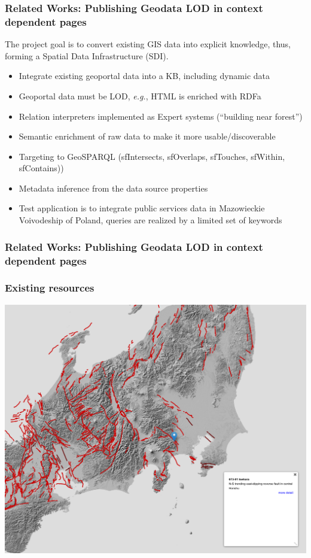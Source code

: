 \documentclass[10pt]{beamer}
\begin{document}
\begin{frame}
  \frametitle{Related Works: Publishing Geodata LOD in context dependent pages}
  The project \cite{iwaniak17} goal is to convert existing GIS data into explicit knowledge, thus, forming a Spatial Data Infrastructure (SDI).
  \begin{itemize}
  \item Integrate existing geoportal data into a KB, including dynamic data
  \item Geoportal data must be LOD, \emph{e.g.}, HTML is enriched with RDFa
  \item Relation interpreters implemented as Expert systems (``building near forest'')
  \item Semantic enrichment of raw data to make it more usable/discoverable
  \item Targeting to GeoSPARQL (sfIntersects, sfOverlaps, sfTouches, sfWithin, sfContains))
  \item Metadata inference from the data source properties
  \item Test application is to integrate public services data in Mazowieckie Voivodeship of Poland, queries are realized by a limited set of keywords
  \end{itemize}
\end{frame}

\begin{frame}
  \frametitle{Related Works: Publishing Geodata LOD in context dependent pages}
\end{frame}

\begin{frame}
  \frametitle{Existing resources}
  \centering
  \includegraphics[width=\linewidth]{japan.png}
\end{frame}
\end{document}
